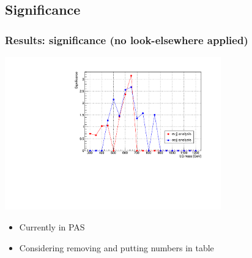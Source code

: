 \documentclass[bigger]{beamer}
\begin{document}
\subsection{Significance}
\label{sec-5-3}
\begin{frame}
\frametitle{Results: significance (no look-elsewhere applied)}
\label{sec-5-3-1}
\label{sec-5-3-1-1}

\centering
\includegraphics[width=0.7\textwidth]{fig/signif/signifs.pdf}
\begin{itemize}

\item Currently in PAS
\label{sec-5-3-1-2}%

\item Considering removing and putting numbers in table
\label{sec-5-3-1-3}%
\end{itemize} %
\end{frame}
\end{document}
